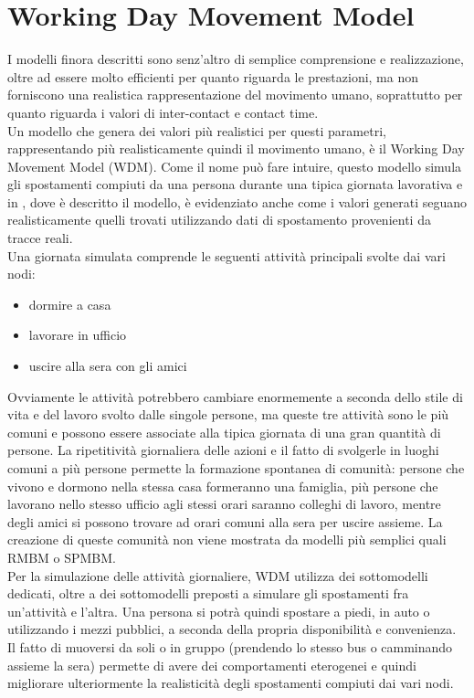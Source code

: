 \section{Working Day Movement Model}
\label{descrWDM}
I modelli finora descritti sono senz'altro di semplice comprensione e realizzazione, oltre ad essere molto efficienti per quanto riguarda le prestazioni, ma non forniscono una realistica rappresentazione del movimento umano, soprattutto per quanto riguarda i valori di inter-contact e contact time.
\\
Un modello che genera dei valori più realistici per questi parametri, rappresentando più realisticamente quindi il movimento umano, è il Working Day Movement Model (WDM). Come il nome può fare intuire, questo modello simula gli spostamenti compiuti da una persona durante una tipica giornata lavorativa e in \cite{articoloWdm}, dove è descritto il modello, è evidenziato anche come i valori generati seguano realisticamente quelli trovati utilizzando dati di spostamento provenienti da tracce reali. 
\\
Una giornata simulata comprende le seguenti attività principali svolte dai vari nodi:
\begin{itemize}
\item dormire a casa
\item lavorare in ufficio
\item uscire alla sera con gli amici
\end{itemize}

Ovviamente le attività potrebbero cambiare enormemente a seconda dello stile di vita e del lavoro svolto dalle singole persone, ma queste tre attività sono le più comuni e possono essere associate alla tipica giornata di una gran quantità di persone.
La ripetitività giornaliera delle azioni e il fatto di svolgerle in luoghi comuni a più persone permette la formazione spontanea di comunità: persone che vivono e dormono nella stessa casa formeranno una famiglia, più persone che lavorano nello stesso ufficio agli stessi orari saranno colleghi di lavoro, mentre degli amici si possono trovare ad orari comuni alla sera per uscire assieme.
La creazione di queste comunità non viene mostrata da modelli più semplici quali RMBM o SPMBM.
\\

Per la simulazione delle attività giornaliere, WDM utilizza dei sottomodelli dedicati, oltre a dei sottomodelli preposti a simulare gli spostamenti fra un'attività e l'altra. Una persona si potrà quindi spostare a piedi, in auto o utilizzando i mezzi pubblici, a seconda della propria disponibilità e convenienza. Il fatto di muoversi da soli o in gruppo (prendendo lo stesso bus o camminando assieme la sera) permette di avere dei comportamenti eterogenei e quindi migliorare ulteriormente la realisticità degli spostamenti compiuti dai vari nodi.
\\

